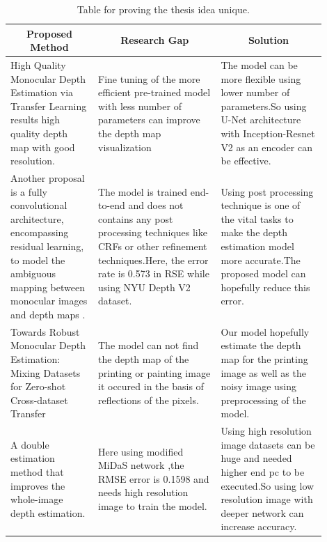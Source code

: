 \documentclass[a4paper,12pt,oneside]{book}
\begin{document}
\begin{table}[!htb]
\centering
\begin{threeparttable}
\captionsetup{font=small}
\caption{Table for proving the thesis idea unique.}
\label{tab:test}
\small %

\begin{tabular}{|p{0.25\linewidth}|p{0.35\linewidth}|p{0.30\linewidth}|}
\hline
\multicolumn{1}{|c|}{\textbf{Proposed Method}} & \multicolumn{1}{c|}{\textbf{Research Gap}} & \multicolumn{1}{c|}{\textbf{Solution}} \\  
\hline
High Quality Monocular Depth Estimation via Transfer Learning \cite{c1}
results high quality depth map with good resolution. &
Fine tuning of the more efficient pre-trained model with less number of parameters can improve the depth map visualization  &
The model can be more flexible using lower number of parameters.So using U-Net architecture with Inception-Resnet V2 \cite{szegedy2016inceptionv4} as an encoder can be effective. \\ \hline

Another proposal is a fully convolutional architecture, encompassing residual learning, to model the ambiguous mapping between monocular images and depth maps \cite{c2}. &
The model is trained end-to-end
and does not contains any post processing techniques like CRFs or other refinement techniques.Here, the error rate is 0.573 in RSE while using NYU Depth V2 dataset. &
Using post processing technique is one of the vital tasks to make the depth estimation model more accurate.The proposed model can hopefully reduce this error. \\ \hline

Towards Robust Monocular Depth Estimation: Mixing Datasets for Zero-shot Cross-dataset Transfer &
The model can not find the depth map of the printing or painting image it occured in the basis of reflections of the pixels. &
Our model hopefully estimate the depth map for the printing image as well as the noisy image using preprocessing of the model. \\ 
\hline

A double estimation method \cite{c5} that improves the whole-image depth estimation. &
Here using modified MiDaS network ,the RMSE error is 
0.1598 and needs high resolution image to train the model. &
Using high resolution image datasets can be huge and needed higher end pc to be executed.So using low resolution image with deeper network can increase accuracy. \\ 
\hline


\end{tabular}
\end{threeparttable}
\end{table}
\end{document}
